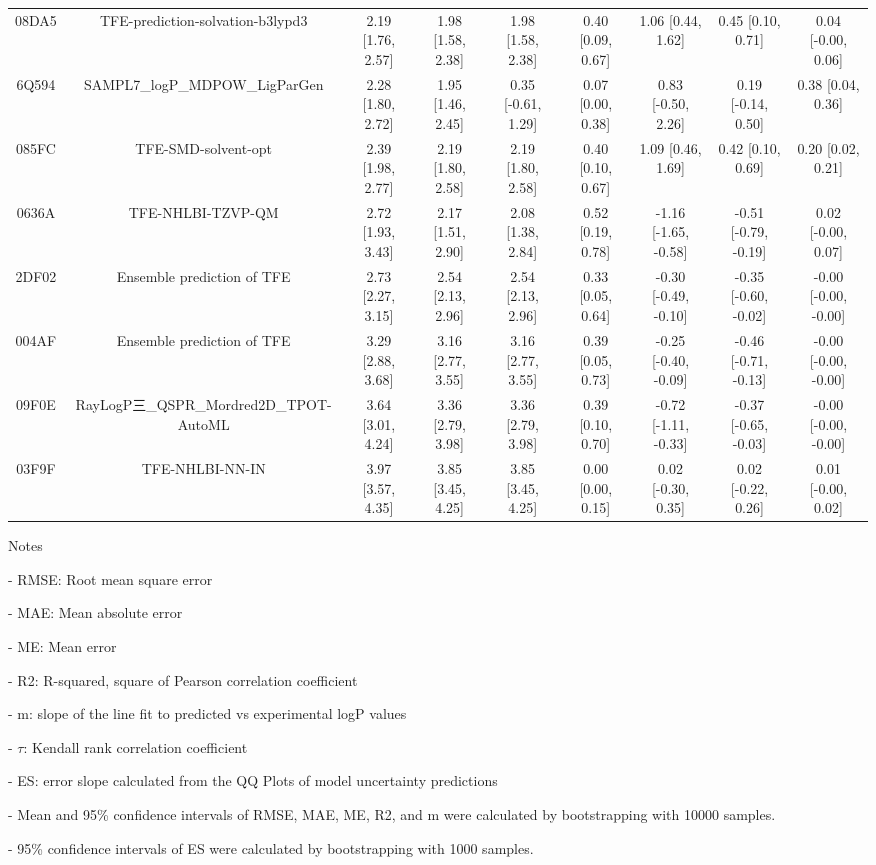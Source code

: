\documentclass{article}
\begin{document}
\begin{center}
\begin{longtable}{|ccccccccc|}
 08DA5 &                   TFE-prediction-solvation-b3lypd3 &  2.19 [1.76, 2.57] &  1.98 [1.58, 2.38] &     1.98 [1.58, 2.38] &  0.40 [0.09, 0.67] &     1.06 [0.44, 1.62] &     0.45 [0.10, 0.71] &    0.04 [-0.00, 0.06] \\
 6Q594 &                     SAMPL7\_logP\_MDPOW\_LigParGen &  2.28 [1.80, 2.72] &  1.95 [1.46, 2.45] &    0.35 [-0.61, 1.29] &  0.07 [0.00, 0.38] &    0.83 [-0.50, 2.26] &    0.19 [-0.14, 0.50] &     0.38 [0.04, 0.36] \\
 085FC &                                TFE-SMD-solvent-opt &  2.39 [1.98, 2.77] &  2.19 [1.80, 2.58] &     2.19 [1.80, 2.58] &  0.40 [0.10, 0.67] &     1.09 [0.46, 1.69] &     0.42 [0.10, 0.69] &     0.20 [0.02, 0.21] \\
 0636A &                                  TFE-NHLBI-TZVP-QM &  2.72 [1.93, 3.43] &  2.17 [1.51, 2.90] &     2.08 [1.38, 2.84] &  0.52 [0.19, 0.78] &  -1.16 [-1.65, -0.58] &  -0.51 [-0.79, -0.19] &    0.02 [-0.00, 0.07] \\
 2DF02 &                         Ensemble prediction of TFE &  2.73 [2.27, 3.15] &  2.54 [2.13, 2.96] &     2.54 [2.13, 2.96] &  0.33 [0.05, 0.64] &  -0.30 [-0.49, -0.10] &  -0.35 [-0.60, -0.02] &  -0.00 [-0.00, -0.00] \\
 004AF &                         Ensemble prediction of TFE &  3.29 [2.88, 3.68] &  3.16 [2.77, 3.55] &     3.16 [2.77, 3.55] &  0.39 [0.05, 0.73] &  -0.25 [-0.40, -0.09] &  -0.46 [-0.71, -0.13] &  -0.00 [-0.00, -0.00] \\
 09F0E &             RayLogP三\_QSPR\_Mordred2D\_TPOT-AutoML &  3.64 [3.01, 4.24] &  3.36 [2.79, 3.98] &     3.36 [2.79, 3.98] &  0.39 [0.10, 0.70] &  -0.72 [-1.11, -0.33] &  -0.37 [-0.65, -0.03] &  -0.00 [-0.00, -0.00] \\
 03F9F &                                    TFE-NHLBI-NN-IN &  3.97 [3.57, 4.35] &  3.85 [3.45, 4.25] &     3.85 [3.45, 4.25] &  0.00 [0.00, 0.15] &    0.02 [-0.30, 0.35] &    0.02 [-0.22, 0.26] &    0.01 [-0.00, 0.02] \\
\end{longtable}
\end{center}

Notes

- RMSE: Root mean square error

- MAE: Mean absolute error

- ME: Mean error

- R2: R-squared, square of Pearson correlation coefficient

- m: slope of the line fit to predicted vs experimental logP values

- $\tau$:  Kendall rank correlation coefficient

- ES: error slope calculated from the QQ Plots of model uncertainty predictions

- Mean and 95\% confidence intervals of RMSE, MAE, ME, R2, and m were calculated by bootstrapping with 10000 samples.

- 95\% confidence intervals of ES were calculated by bootstrapping with 1000 samples.\end{document}
\end{document}
